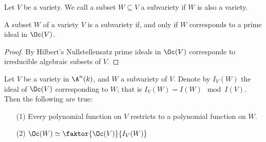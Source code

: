 \begin{definition}
  Let $V$ be a variety. We call a subset  $W \subseteq V$ a subvariety if $W$ is
  also a variety.
\end{definition}

\begin{proposition}\label{proposition_2.1.2}
  A subset $W$ of a variety  $V$ is a subvariety if, and only if  $W$
  corresponds to a prime ideal in  $\Oc(V)$.
\end{proposition}
\begin{proof}
  By Hilbert's Nullstellensatz prime ideals in $\Oc(V)$ corresponde to
  irreducible algebraic subsets of $V$.
\end{proof}

\begin{proposition}\label{proposition_2.1.3}
  Let $V$ be a variety in  $\A^n(k)$, and $W$ a subvariety of $V$. Denote by
  $I_V(W)$ the ideal of $\Oc(V)$ corresponding to $W$; that is  $I_V(W)=I(W)
  \mod{I(V)}$. Then the following are true:
  \begin{enumerate}
    \item[(1)] Every polynomial function on $V$ restricts to a polynomial
      function on $W$.

    \item[(2)] $\Oc(W) \simeq \faktor{\Oc(V)}{I_V(W)}$
  \end{enumerate}
\end{proposition}
